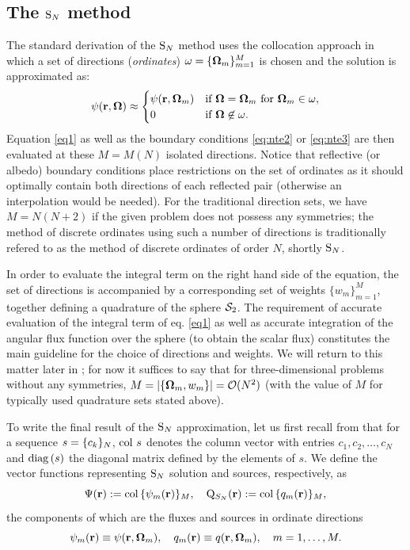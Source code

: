 \subsection{The $\text{S}_{N}$ method}\label{sec:1-SN}
The standard derivation of the $\text{S}_{N}$ method uses the collocation approach in which a set of directions
(\textit{ordinates}) $\omega = \{\mathbf{\Omega}_m\}_{m=1}^{M}$ is chosen and the solution is approximated as:
\begin{equation}\label{eq:sn_approx} 
	\psi(\mathbf{r}, \mathbf{\Omega}) \approx 
		\begin{cases}\displaystyle \psi(\mathbf{r},\mathbf{\Omega}_m) & \mbox{if $\mathbf{\Omega} = \mathbf{\Omega}_m$ for $\mathbf{\Omega}_m \in \omega$},\\ 0 & \mbox{if $\mathbf{\Omega} \not \in \omega$.} \end{cases} 
\end{equation}
Equation \eqref{eq1} as well as the boundary conditions \eqref{eq:nte2} or \eqref{eq:nte3} are then evaluated at these
$M = M(N)$ isolated directions. Notice that reflective (or albedo) boundary conditions place restrictions on the set of
ordinates as it should optimally contain both directions of each reflected pair (otherwise an interpolation would be
needed). For the traditional direction sets, we have $M = N(N+2)$ if the given problem does not possess any symmetries;
the method of discrete ordinates using such a number of directions is traditionally refered to as the method of 
discrete ordinates of order $N$, shortly $\text{S}_{N}$.

In order to evaluate the integral term on the right hand side of the equation, the set of directions is accompanied by a
corresponding set of weights $\{w_m\}_{m=1}^{M}$, together defining a quadrature of the sphere $\mathcal{S}_2$. The
requirement of accurate evaluation of the integral term of eq.
\eqref{eq1} as well as accurate integration of the angular flux function over the sphere (to obtain the scalar flux)
constitutes the main guideline for the choice of directions and weights. We will return to this matter later in 
; for now it suffices to say that for three-dimensional problems without any symmetries, \mbox{$M = \left|\{\mathbf{\Omega}_m, w_m\}\right| = \mathcal{O}(N^2)$} (with the
value of $M$ for typically used quadrature sets stated above).

To write  the final result of the $\text{S}_{N}$ approximation, let us first recall from  that for a sequence
$s = \{c_k\}_N$, $\operatorname{col\,} s$ denotes the column vector with entries $c_1,c_2,\ldots,c_N$ and $\operatorname{diag\,}(s)$ the 
diagonal matrix defined by the elements of $s$. 
We define the vector functions representing $\text{S}_{N}$ solution and sources, respectively, as 
\begin{equation}\label{eq:sn_vars}
\Psi(\mathbf{r}) := \operatorname{col\,}\{\psi_m(\mathbf{r})\}_{M},\quad
\mathrm{Q}_{S_N}(\mathbf{r}) := \operatorname{col\,}\{q_m(\mathbf{r})\}_{M},
\end{equation}
the components of which are the fluxes and sources in ordinate directions
\begin{equation}\label{eq:sn_vecs}
\psi_m(\mathbf{r}) \equiv \psi(\mathbf{r},\mathbf{\Omega}_m), \quad q_m(\mathbf{r}) \equiv
q(\mathbf{r},\mathbf{\Omega}_m),\quad m = 1,\ldots, M.
\end{equation}

